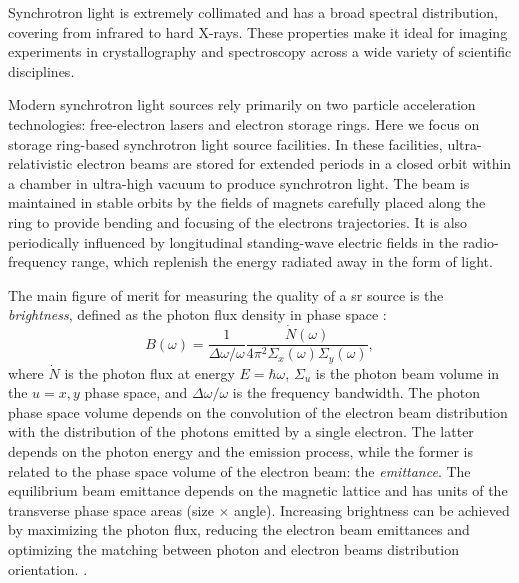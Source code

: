 Synchrotron light is extremely collimated and has a broad spectral distribution, covering from infrared to hard X-rays. These properties make it ideal for imaging experiments in crystallography and spectroscopy across a wide variety of scientific disciplines.

Modern synchrotron light sources rely primarily on two particle acceleration technologies: free-electron lasers and electron storage rings. Here we focus on storage ring-based synchrotron light source facilities. In these facilities, ultra-relativistic electron beams are stored for extended periods in a closed orbit within a chamber in ultra-high vacuum to produce synchrotron light. The beam is maintained in stable orbits by the fields of magnets carefully placed along the ring to provide bending and focusing of the electrons trajectories. It is also periodically influenced by longitudinal standing-wave electric fields in the radio-frequency range, which replenish the energy radiated away in the form of light.

The main figure of merit for measuring the quality of a \gls{sr} source is the \textit{brightness}\cite{huang_brightness_2013}, defined as the photon flux density in phase space \cite{hettel_challenges_2014,wiedemann_particle_2015}:
\begin{equation}
    B(\omega) = \frac{1}{\Delta \omega/\omega}\frac{\dot{N}(\omega)}{4\pi^2\Sigma_{x}(\omega)\Sigma_{y}(\omega)},
\end{equation}
where $\dot{N}$ is the photon flux at energy $E=\hbar\omega$, $\Sigma_{u}$ is the photon beam volume in the $u=x,y$ phase space, and $\Delta\omega/\omega$ is the frequency bandwidth. The photon phase space volume depends on the convolution of the electron beam distribution with the distribution of the photons emitted by a single electron. The latter depends on the photon energy and the emission process, while the former is related to the phase space volume of the electron beam: the \textit{emittance}. The equilibrium beam emittance depends on the magnetic lattice and has units of the transverse phase space areas (size $\times$ angle). Increasing brightness can be achieved by maximizing the photon flux, reducing the electron beam emittances and optimizing the matching between photon and electron beams distribution orientation. \cite{wiedemann_particle_2015}.


